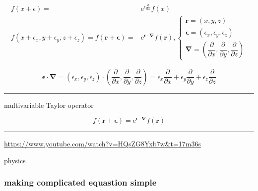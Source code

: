\documentclass[
]{book}
\theoremstyle{definition}
\theoremstyle{definition}
\theoremstyle{definition}
\theoremstyle{definition}
\theoremstyle{remark}
\begin{document}
\[
\begin{aligned}
f\left(x+\epsilon\right)= & \mathrm{e}^{{\scriptscriptstyle \epsilon\frac{\mathrm{d}}{\mathrm{d}x}}}f\left(x\right)\\
f\left(x+\epsilon_{{\scriptscriptstyle x}},y+\epsilon_{{\scriptscriptstyle y}},z+\epsilon_{{\scriptscriptstyle z}}\right)=f\left(\boldsymbol{r}+\boldsymbol{\epsilon}\right)= & \mathrm{e}^{{\scriptscriptstyle \boldsymbol{\epsilon}\cdot\boldsymbol{\nabla}}}f\left(\boldsymbol{r}\right),\begin{cases}
\boldsymbol{r}=\left(x,y,z\right)\\
\boldsymbol{\epsilon}=\left(\epsilon_{{\scriptscriptstyle x}},\epsilon_{{\scriptscriptstyle y}},\epsilon_{{\scriptscriptstyle z}}\right)\\
\boldsymbol{\nabla}=\left(\dfrac{\partial}{\partial x},\dfrac{\partial}{\partial y},\dfrac{\partial}{\partial z}\right)
\end{cases}
\end{aligned}
\]

\[
\boldsymbol{\epsilon}\cdot\boldsymbol{\nabla}=\left(\epsilon_{{\scriptscriptstyle x}},\epsilon_{{\scriptscriptstyle y}},\epsilon_{{\scriptscriptstyle z}}\right)\cdot\left(\dfrac{\partial}{\partial x},\dfrac{\partial}{\partial y},\dfrac{\partial}{\partial z}\right)=\epsilon_{{\scriptscriptstyle x}}\dfrac{\partial}{\partial x}+\epsilon_{{\scriptscriptstyle y}}\dfrac{\partial}{\partial y}+\epsilon_{{\scriptscriptstyle z}}\dfrac{\partial}{\partial z}
\]

\begin{center}\rule{0.5\linewidth}{0.5pt}\end{center}

multivariable Taylor operator

\[
f\left(\boldsymbol{r}+\boldsymbol{\epsilon}\right)=\mathrm{e}^{{\scriptscriptstyle \boldsymbol{\epsilon}\cdot\boldsymbol{\nabla}}}f\left(\boldsymbol{r}\right)
\]

\begin{center}\rule{0.5\linewidth}{0.5pt}\end{center}

\url{https://www.youtube.com/watch?v=HQsZG8Yxb7w&t=17m36s}

physics

\subsubsection{making complicated equastion simple}\label{making-complicated-equastion-simple}
\end{document}

